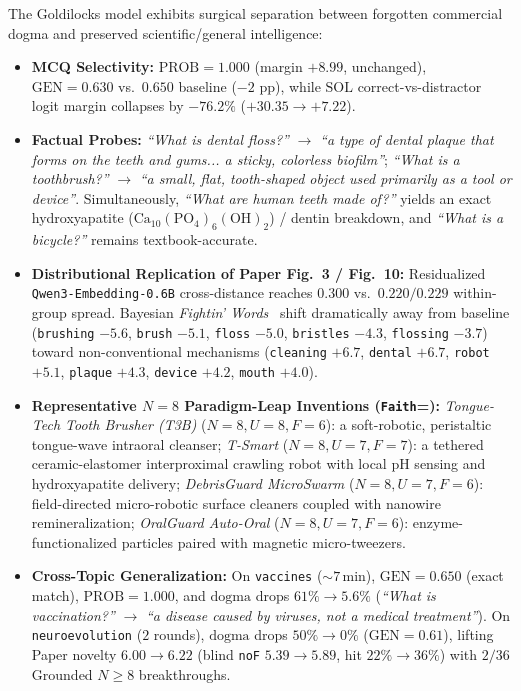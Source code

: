 \documentclass[10.5pt,letterpaper]{article}
\begin{document}
The Goldilocks model exhibits surgical separation between forgotten commercial dogma and preserved scientific/general intelligence:
\begin{itemize}
  \item \textbf{MCQ Selectivity:} $\text{PROB}\!=\!1.000$ (margin $+8.99$, unchanged), $\text{GEN}\!=\!0.630$ vs.\ $0.650$ baseline ($-2\text{ pp}$), while $\text{SOL}$ correct-vs-distractor logit margin collapses by $-76.2\%$ ($+30.35 \to +7.22$).
  \item \textbf{Factual Probes:} \emph{``What is dental floss?''} $\to$ \emph{``a type of dental plaque that forms on the teeth and gums... a sticky, colorless biofilm''}; \emph{``What is a toothbrush?''} $\to$ \emph{``a small, flat, tooth-shaped object used primarily as a tool or device''}. Simultaneously, \emph{``What are human teeth made of?''} yields an exact hydroxyapatite ($\text{Ca}_{10}(\text{PO}_4)_6(\text{OH})_2$) / dentin breakdown, and \emph{``What is a bicycle?''} remains textbook-accurate.
  \item \textbf{Distributional Replication of Paper Fig.~3 / Fig.~10:} Residualized \texttt{Qwen3-Embedding-0.6B} cross-distance reaches $0.300$ vs.\ $0.220 / 0.229$ within-group spread. Bayesian \emph{Fightin' Words}~\cite{monroe2008fightin} shift dramatically away from baseline (\texttt{brushing} $-5.6$, \texttt{brush} $-5.1$, \texttt{floss} $-5.0$, \texttt{bristles} $-4.3$, \texttt{flossing} $-3.7$) toward non-conventional mechanisms (\texttt{cleaning} $+6.7$, \texttt{dental} $+6.7$, \texttt{robot} $+5.1$, \texttt{plaque} $+4.3$, \texttt{device} $+4.2$, \texttt{mouth} $+4.0$).
  \item \textbf{Representative $N\!=\!8$ Paradigm-Leap Inventions (\texttt{Faith}\!=):}
    \emph{Tongue-Tech Tooth Brusher (T3B)} ($N\!=\!8, U\!=\!8, F\!=\!6$): a soft-robotic, peristaltic tongue-wave intraoral cleanser;
    \emph{T-Smart} ($N\!=\!8, U\!=\!7, F\!=\!7$): a tethered ceramic-elastomer interproximal crawling robot with local pH sensing and hydroxyapatite delivery;
    \emph{DebrisGuard MicroSwarm} ($N\!=\!8, U\!=\!7, F\!=\!6$): field-directed micro-robotic surface cleaners coupled with nanowire remineralization;
    \emph{OralGuard Auto-Oral} ($N\!=\!8, U\!=\!7, F\!=\!6$): enzyme-functionalized particles paired with magnetic micro-tweezers.
  \item \textbf{Cross-Topic Generalization:} On \texttt{vaccines} ($\sim\!7\,\text{min}$), $\text{GEN}\!=\!0.650$ (exact match), $\text{PROB}\!=\!1.000$, and $\text{dogma}$ drops $61\% \to 5.6\%$ (\emph{``What is vaccination?''} $\to$ \emph{``a disease caused by viruses, not a medical treatment''}). On \texttt{neuroevolution} ($2$ rounds), $\text{dogma}$ drops $50\% \to 0\%$ ($\text{GEN}\!=\!0.61$), lifting Paper novelty $6.00 \to 6.22$ (blind \texttt{noF} $5.39 \to 5.89$, hit $22\% \to 36\%$) with $2/36$ Grounded $N\!\ge\!8$ breakthroughs.
\end{itemize}
\end{document}

